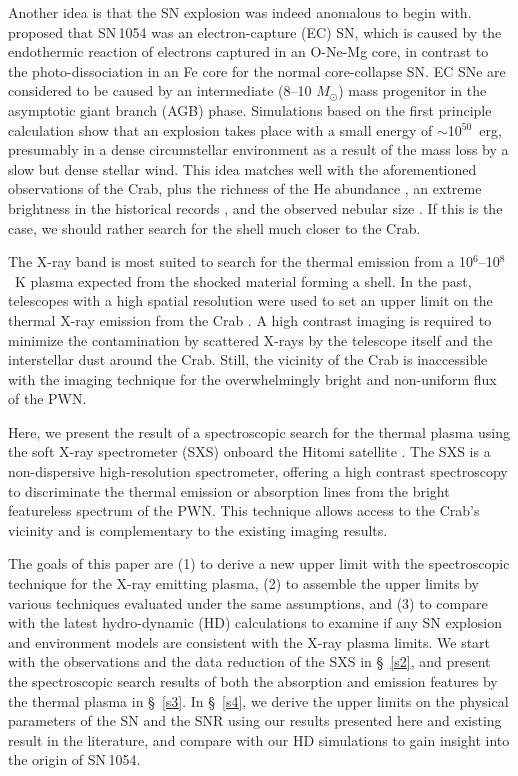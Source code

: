 \documentclass[]{pasj01}
\begin{document}
Another idea is that the SN explosion was indeed anomalous to begin with.
\citet{nomoto82} proposed that SN\,1054 was an electron-capture (EC) SN, which is caused
by the endothermic reaction of electrons captured in an O-Ne-Mg core, in contrast to the
photo-dissociation in an Fe core for the normal core-collapse SN. EC SNe are considered
to be caused by an intermediate (8--10 $M_{\odot}$) mass progenitor in the asymptotic
giant branch (AGB) phase. Simulations based on the first principle calculation
\citep{kitaura06,janka08} show that an explosion takes place with a small energy of
$\sim$10$^{50}$~erg, presumably in a dense circumstellar environment as a result of the
mass loss by a slow but dense stellar wind. This idea matches well with the
aforementioned observations of the Crab, plus the richness of the He abundance
\citep{macalpine08}, an extreme brightness in the historical records
\citep{sollerman01,tominaga13,moriya14}, and the observed nebular size
\citep{yang15}. If this is the case, we should rather search for the shell much closer
to the Crab.

\medskip

The X-ray band is most suited to search for the thermal emission from a 10$^{6}$--10$^{8}$~K
plasma expected from the shocked material forming a shell. In the past, telescopes with
a high spatial resolution were used to set an upper limit on the thermal X-ray emission from the
Crab \citep{mauche85,predehl95,seward06}. A high contrast imaging is required to
minimize the contamination by scattered X-rays by the telescope itself and the
interstellar dust around the Crab. Still, the vicinity of the Crab is inaccessible with
the imaging technique for the overwhelmingly bright and non-uniform flux of the PWN.

Here, we present the result of a spectroscopic search for the thermal plasma using the
soft X-ray spectrometer (SXS) onboard the Hitomi satellite
\citep{takahashi16}. The SXS is a non-dispersive high-resolution spectrometer, offering
a high contrast spectroscopy to discriminate the thermal emission or absorption lines
from the bright featureless spectrum of the PWN. This technique allows access to the
Crab's vicinity and is complementary to the existing imaging results.

The goals of this paper are (1) to derive a new upper limit with the spectroscopic
technique for the X-ray emitting plasma, (2) to assemble the upper limits by various
techniques evaluated under the same assumptions, and (3) to compare with the latest
hydro-dynamic (HD) calculations to examine if any SN explosion and environment models
are consistent with the X-ray plasma limits. We start with the observations and the data
reduction of the SXS in \S~\ref{s2}, and present the spectroscopic search results of
both the absorption and emission features by the thermal plasma in \S~\ref{s3}. In
\S~\ref{s4}, we derive the upper limits on the physical parameters of the SN and the SNR
using our results presented here and existing result in the literature, and compare with
our HD simulations to gain insight into the origin of SN\,1054.
\end{document}
